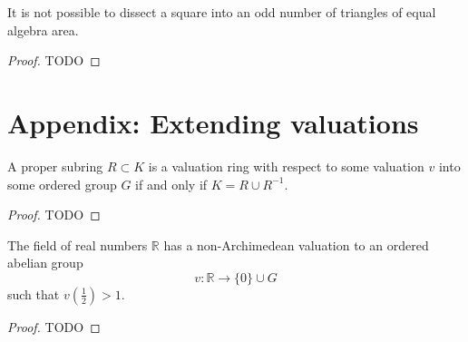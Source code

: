 \begin{theorem}
  \label{monsky_theorem}
  It is not possible to dissect a square into an odd number of triangles of equal algebra area.
\end{theorem}
\begin{proof}
  TODO
\end{proof}


\section*{Appendix: Extending valuations}

\begin{lemma}
  \label{valuation_lemma}
  A proper subring $R\subset K$ is a valuation ring with respect to some
  valuation $v$ into some ordered group $G$ if and only if $K = R \cup R^{-1}$.
\end{lemma}
\begin{proof}
  TODO
\end{proof}

\begin{theorem}
  \label{valuation_on_reals}
  The field of real numbers $\mathbb{R}$ has a non-Archimedean valuation
  to an ordered abelian group
  \[v: \mathbb{R} \to \{0\} \cup G\]
  such that $v(\frac{1}{2}) > 1$.
\end{theorem}
\begin{proof}
  TODO
\end{proof}
